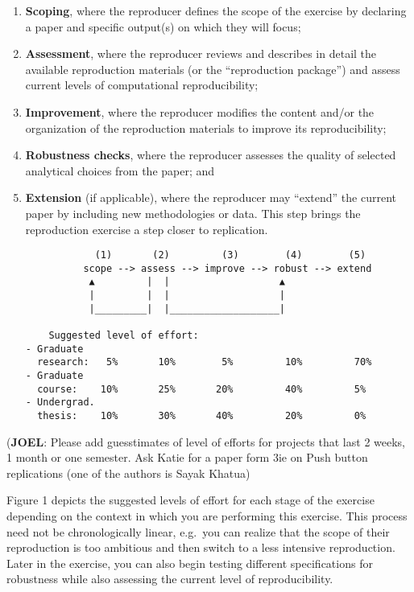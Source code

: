 \documentclass[]{book}
\begin{document}
\begin{enumerate}
\def\labelenumi{\arabic{enumi}.}
\item
  \textbf{Scoping}, where the reproducer defines the scope of the exercise by declaring a paper and specific output(s) on which they will focus;\\
\item
  \textbf{Assessment}, where the reproducer reviews and describes in detail the available reproduction materials (or the ``reproduction package'') and assess current levels of computational reproducibility;\\
\item
  \textbf{Improvement}, where the reproducer modifies the content and/or the organization of the reproduction materials to improve its reproducibility;\\
\item
  \textbf{Robustness checks}, where the reproducer assesses the quality of selected analytical choices from the paper; and\\
\item
  \textbf{Extension} (if applicable), where the reproducer may ``extend'' the current paper by including new methodologies or data. This step brings the reproduction exercise a step closer to replication.

\begin{verbatim}
            (1)       (2)         (3)        (4)        (5)
          scope --> assess --> improve --> robust --> extend
           ▲         |  |                   ▲
           |         |  |                   |
           |_________|  |___________________|

    Suggested level of effort:
- Graduate
  research:   5%       10%        5%         10%         70%
- Graduate
  course:    10%       25%       20%         40%         5%
- Undergrad.
  thesis:    10%       30%       40%         20%         0%
\end{verbatim}
\end{enumerate}

(\textbf{JOEL}: Please add guesstimates of level of efforts for projects that last 2 weeks, 1 month or one semester. Ask Katie for a paper form 3ie on Push button replications (one of the authors is Sayak Khatua)

Figure 1 depicts the suggested levels of effort for each stage of the exercise depending on the context in which you are performing this exercise. This process need not be chronologically linear, e.g.~you can realize that the scope of their reproduction is too ambitious and then switch to a less intensive reproduction. Later in the exercise, you can also begin testing different specifications for robustness while also assessing the current level of reproducibility.
\end{document}
